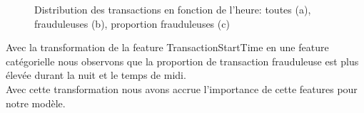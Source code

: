 \documentclass{article}
\begin{document}
\begin{figure}
  
    \caption{Distribution des transactions en fonction de l'heure: toutes (a), frauduleuses (b), proportion frauduleuses (c)}
  \end{figure}

Avec la transformation de la feature TransactionStartTime en une feature catégorielle nous observons que la proportion de transaction frauduleuse est plus élevée durant la nuit et le temps de midi.\\
Avec cette transformation nous avons accrue l'importance de cette features pour notre modèle.\\
\end{document}
